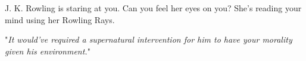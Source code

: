 J. K. Rowling is staring at you. Can you feel her eyes on you? She’s reading your mind using her Rowling Rays.

"\emph{It would’ve required a \emph{supernatural intervention} for him to have \emph{your} morality given \emph{his} environment.}"


